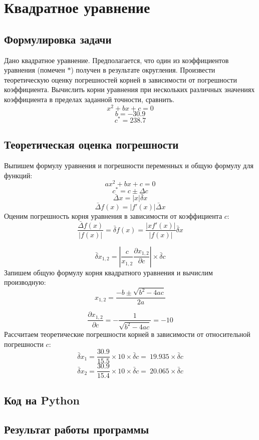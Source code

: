 \documentclass[a4paper,12pt]{article}
\newenvironment{longlisting}{\captionsetup{type=listing}}{}
\begin{document}
\section{Квадратное уравнение}
\subsection{Формулировка задачи}
Дано квадратное уравнение. Предполагается, что один из коэффициентов уравнения (помечен $*$) получен в результате округления. Произвести теоретическую оценку погрешностей корней в зависимости от погрешности коэффициента. Вычислить корни уравнения при нескольких различных значениях коэффициента в пределах заданной точности, сравнить.
$$x^2+bx+c = 0$$
$$b = -30.9$$
$$c^* = 238.7 $$
    
\subsection{Теоретическая оценка погрешности}

Выпишем формулу уравнения и погрешности переменных и общую формулу для функций:
$$ax^2 + bx + c = 0$$
$$c^* = c \pm \Delta c$$
$$\bar{\Delta} x = |x| \bar{\delta} x$$
$$\bar{\Delta} f(x) = |f'(x)| \bar{\Delta} x$$
Оценим погрешность корня уравнения в зависимости от коэффициента $c$:
$$\frac{\bar{\Delta} f(x)}{|f(x)|} = \bar{\delta} f(x) = \frac{|xf'(x)|}{|f(x)|}\bar{\delta}x$$

$$\bar{\delta} x_{1,2} = |\frac{c}{x_{1,2}} \frac{\partial x_{1,2}}{\partial c} | \times \bar{\delta} c$$
Запишем общую формулу корня квадратного уравнения и вычислим производную:
$$x_{1,2} = \frac{-b \pm \sqrt{b^2-4ac}}{2a} $$

$$\frac{\partial x_{1,2}}{\partial c} = -\frac{1}{\sqrt{b^2-4ac}} = -10$$
Рассчитаем теоретические погрешности корней в зависимости от относительной погрешности $c$:
$$\bar{\delta} x_{1} = \frac{30.9}{15.5} \times 10 \times \bar{\delta} c = ~19.935 \times \bar{\delta} c $$
$$\bar{\delta} x_{2} = \frac{30.9}{15.4} \times 10 \times \bar{\delta} c = ~20.065 \times \bar{\delta} c$$
   
\subsection{Код на Python}
\begin{longlisting}
\end{longlisting}

\subsection{Результат работы программы}
\begin{longlisting}

\end{longlisting}
\end{document}

